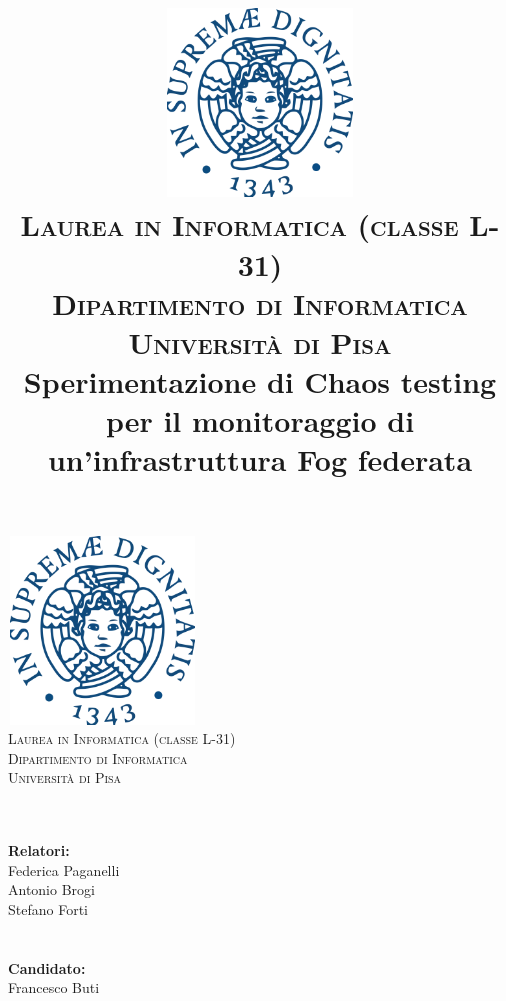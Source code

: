 \documentclass[12pt]{book}
\title{\includegraphics[width=5cm, height=5cm]{images/Stemma_unipi.png}
    \\\textsc{\small Laurea in Informatica (classe L-31)\\Dipartimento di Informatica\\Università di Pisa}\\\vfill Sperimentazione di Chaos testing per il monitoraggio di un’infrastruttura Fog federata}
\date{}
\begin{document}
\begin{titlepage}

\begin{center}
    \includegraphics[width=5cm, height=5cm]{images/Stemma_unipi.png}
    \\\textsc{Laurea in Informatica (classe L-31)\\Dipartimento di Informatica\\Università di Pisa}
\end{center}

\begingroup
\let\newpage\relax%
\maketitle
\endgroup
\begin{multicols}{3}
\noindent
\\\\\textbf{Relatori:}\\Federica Paganelli\\Antonio Brogi\\Stefano Forti\\ \columnbreak\linebreak \columnbreak\linebreak
\\\\\textbf{Candidato:}\\Francesco Buti
\end{multicols}
\end {titlepage}

\newpage
\renewcommand{\contentsname}{Indice}
\renewcommand{\listfigurename}{Indice delle Figure}
\renewcommand{\listtablename}{Indice delle Tabelle}
\tableofcontents

\newpage
\listoftables
\listoffigures











\newpage
\printbibliography

\newpage
\appendix
%

%


\end{document}
